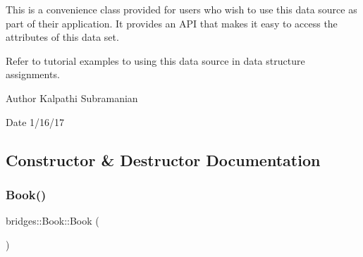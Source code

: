 This is a convenience class provided for users who wish to use this data source as part of their application. It provides an A\+PI that makes it easy to access the attributes of this data set.

Refer to tutorial examples to using this data source in data structure assignments.

\begin{DoxyAuthor}{Author}
Kalpathi Subramanian 
\end{DoxyAuthor}
\begin{DoxyDate}{Date}
1/16/17 
\end{DoxyDate}


\subsection{Constructor \& Destructor Documentation}
\hypertarget{classbridges_1_1_book_abb2903c640bd263a2e077d52e12a773e}{}\label{classbridges_1_1_book_abb2903c640bd263a2e077d52e12a773e} 
\subsubsection{\texorpdfstring{Book()}{Book()}\hspace{0.1cm}{\footnotesize\ttfamily [1/2]}}
{\footnotesize\ttfamily bridges\+::\+Book\+::\+Book (\begin{DoxyParamCaption}{ }\end{DoxyParamCaption})\hspace{0.3cm}{\ttfamily [inline]}}

\hypertarget{classbridges_1_1_book_ac3060f3eaf757c82ea21f6501eb97b80}{}\label{classbridges_1_1_book_ac3060f3eaf757c82ea21f6501eb97b80} 
